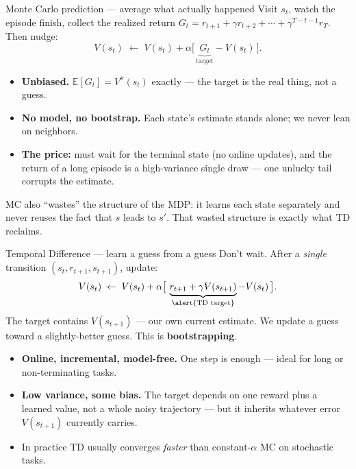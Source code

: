 \documentclass[10pt, aspectratio=169]{beamer}
\begin{document}
\begin{frame}{Monte Carlo prediction --- average what actually happened}
Visit $s_t$, watch the episode finish, collect the realized return $G_t = r_{t+1}+\gamma r_{t+2}+\cdots+\gamma^{T-t-1}r_T$. Then nudge:
\[
V(s_t) \;\leftarrow\; V(s_t) + \alpha\big[\,\underbrace{G_t}_{\text{target}} - V(s_t)\,\big].
\]
\medskip
\begin{itemize}\setlength\itemsep{2pt}
\item \textbf{Unbiased.} $\mathbb{E}[G_t] = V^\pi(s_t)$ exactly --- the target is the real thing, not a guess.
\item \textbf{No model, no bootstrap.} Each state's estimate stands alone; we never lean on neighbors.
\item \textbf{The price:} must wait for the terminal state (no online updates), and the return of a long episode is a \alert{high-variance} single draw --- one unlucky tail corrupts the estimate.
\end{itemize}
\medskip

\pause
{\footnotesize\textcolor{mLightBrown}{MC also ``wastes'' the structure of the MDP: it learns each state separately and never reuses the fact that $s$ leads to $s'$. That wasted structure is exactly what TD reclaims.}}
\end{frame}

\begin{frame}{Temporal Difference --- learn a guess from a guess}
Don't wait. After a \emph{single} transition $(s_t, r_{t+1}, s_{t+1})$, update:
\[
V(s_t) \;\leftarrow\; V(s_t) + \alpha\big[\,\underbrace{r_{t+1} + \gamma V(s_{t+1})}_{\text{\alert{TD target}}} - V(s_t)\,\big].
\]
\medskip
The target contains $V(s_{t+1})$ --- \alert{our own current estimate}. We update a guess toward a slightly-better guess. This is \textbf{bootstrapping}.
\medskip

\pause
\begin{itemize}\setlength\itemsep{2pt}
\item \textbf{Online, incremental, model-free.} One step is enough --- ideal for long or non-terminating tasks.
\item \textbf{Low variance, some bias.} The target depends on one reward plus a learned value, not a whole noisy trajectory --- but it inherits whatever error $V(s_{t+1})$ currently carries.
\item In practice TD usually converges \emph{faster} than constant-$\alpha$ MC on stochastic tasks.
\end{itemize}
\end{frame}
\end{document}

